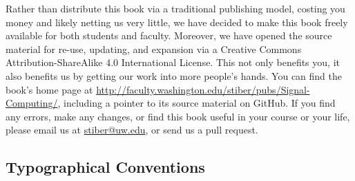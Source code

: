 Rather than distribute this book via a traditional publishing model,
costing you money and likely netting us very little, we have decided
to make this book freely available for both students and
faculty. Moreover, we have opened the source material for re-use,
updating, and expansion via a Creative Commons Attribution-ShareAlike
4.0 International License. This not only benefits you, it also
benefits us by getting our work into more people's hands.  You can
find the book's home page at
\url{http://faculty.washington.edu/stiber/pubs/Signal-Computing/},
including a pointer to its source material on GitHub. If you find any
errors, make any changes, or find this book useful in your course or
your life, please email us at
\href{mailto:stiber@uw.edu}{stiber@uw.edu}, or send us a pull request.

\subsection*{Typographical Conventions}

